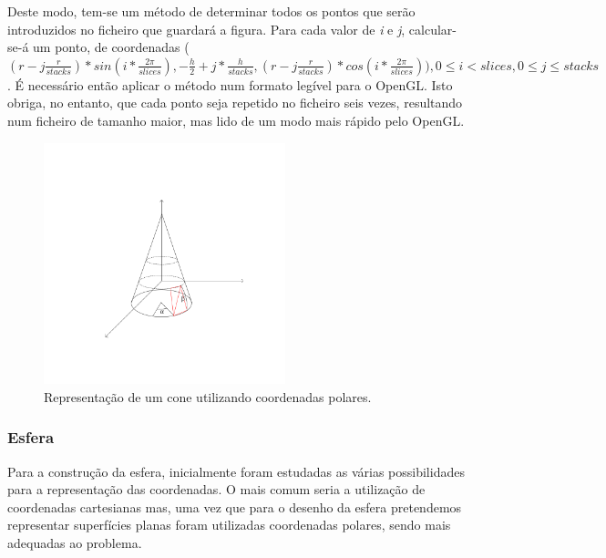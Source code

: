 \documentclass[a4paper]{article}
\begin{document}
\hspace{3mm} Deste modo, tem-se um método de determinar todos os pontos que serão introduzidos no ficheiro que guardará a figura. Para cada valor de \emph{i} e \emph{j}, calcular-se-á um ponto, de coordenadas ($(r - j \frac{r}{stacks}) * sin(i * \frac{2\pi}{slices}), -\frac{h}{2} + j * \frac{h}{stacks}, (r - j \frac{r}{stacks}) * cos(i * \frac{2\pi}{slices})), 0 \leq i < slices, 0 \leq j \leq stacks$. É necessário então aplicar o método num formato legível para o OpenGL. Isto obriga, no entanto, que cada ponto seja repetido no ficheiro seis vezes, resultando num ficheiro de tamanho maior, mas lido de um modo mais rápido pelo OpenGL.

\pagebreak

\begin{figure}[h!]
\centering
\includegraphics[width=7cm]{./imagens/cone.png}
\caption{Representação de um cone utilizando coordenadas polares.}
\label{fig:cone}
\end{figure}

\subsubsection{Esfera} %

\hspace{8mm} Para a construção da esfera, inicialmente foram estudadas as várias possibilidades para a representação das coordenadas. O mais comum seria a utilização de coordenadas cartesianas mas, uma vez que para o desenho da esfera pretendemos representar superfícies planas foram utilizadas coordenadas polares, sendo mais adequadas ao problema.
\end{document}
